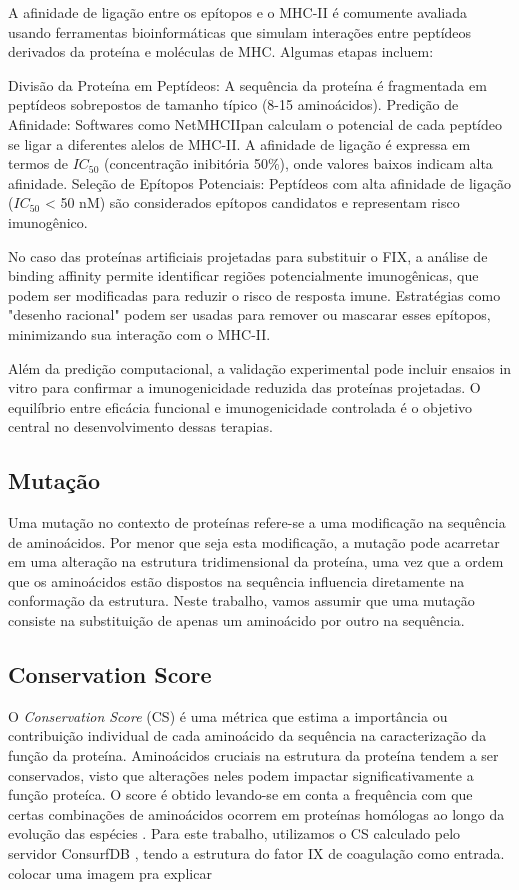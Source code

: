A afinidade de ligação entre os epítopos e o MHC-II é comumente avaliada usando ferramentas bioinformáticas que simulam interações entre peptídeos derivados da proteína e moléculas de MHC.
Algumas etapas incluem:

Divisão da Proteína em Peptídeos:
A sequência da proteína é fragmentada em peptídeos sobrepostos de tamanho típico (8-15 aminoácidos).
Predição de Afinidade:
Softwares como NetMHCIIpan calculam o potencial de cada peptídeo se ligar a diferentes alelos de MHC-II. A afinidade de ligação é expressa em termos de $IC_{50}$ (concentração inibitória 50\%), onde valores baixos indicam alta afinidade.
Seleção de Epítopos Potenciais:
Peptídeos com alta afinidade de ligação ($IC_{50}$ < 50 nM) são considerados epítopos candidatos e representam risco imunogênico.


No caso das proteínas artificiais projetadas para substituir o FIX,
a análise de binding affinity permite identificar regiões potencialmente imunogênicas,
que podem ser modificadas para reduzir o risco de resposta imune.
Estratégias como "desenho racional" podem ser usadas para remover ou mascarar esses epítopos, minimizando sua interação com o MHC-II.


Além da predição computacional, a validação experimental pode incluir ensaios in vitro para confirmar a imunogenicidade reduzida das proteínas projetadas. 
O equilíbrio entre eficácia funcional e imunogenicidade controlada é o objetivo central no desenvolvimento dessas terapias.


\subsection{Mutação}
Uma mutação no contexto de proteínas refere-se a uma modificação na sequência de aminoácidos. 
Por menor que seja esta modificação, a mutação pode acarretar em uma alteração na estrutura tridimensional da proteína,
uma vez que a ordem que os aminoácidos estão dispostos na sequência influencia diretamente na conformação da estrutura. 
Neste trabalho, vamos assumir que uma mutação consiste na substituição de apenas um aminoácido por outro na sequência. 

\subsection{Conservation Score}
O \textit{Conservation Score} (CS) é uma métrica que estima a importância ou contribuição individual de cada aminoácido da sequência na caracterização da função da proteína. Aminoácidos cruciais na estrutura da proteína tendem a ser conservados, visto que alterações neles podem impactar significativamente a função proteíca. 
O score é obtido levando-se em conta a frequência com que certas combinações de aminoácidos ocorrem em proteínas homólogas ao longo da evolução das espécies \cite{Eddy}. 
Para este trabalho, utilizamos o CS calculado pelo servidor ConsurfDB \cite{ConsurfDB}, tendo a estrutura do fator IX de coagulação como entrada. 
{\color{red} colocar uma imagem pra explicar}


